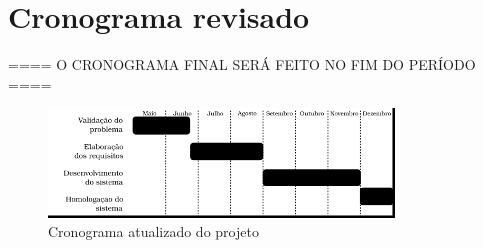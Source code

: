 \section{Cronograma revisado}


==== O CRONOGRAMA FINAL SERÁ FEITO NO FIM DO PERÍODO ====


\begin{figure}[ht!]
    \begin{center}
    \includegraphics[width=260pt]{figuras/cronograma-atualizado}
    \caption{Cronograma atualizado do projeto}
    \label{fig-cronograma-atualizado}
    \end{center}
\end{figure}